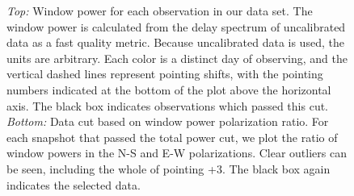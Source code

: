 \documentclass[iop]{emulateapj}
\begin{document}
\begin{figure}
\begin{center}
\caption[Window power cut]{
\emph{Top:} Window power for each observation in our data set. The window power is 
calculated from the delay spectrum of uncalibrated data as a fast quality metric. 
Because uncalibrated data is used, the units are arbitrary.
Each color 
is a distinct day of observing, and the vertical dashed lines represent pointing shifts, with 
the pointing numbers indicated at the bottom of the plot above the horizontal axis. The black 
box indicates observations which passed this cut. \emph{Bottom:} Data cut based on 
window power polarization ratio. For each snapshot that passed the total power cut, we plot 
the ratio of window powers in the N-S and E-W polarizations. Clear outliers can be seen, 
including the whole of pointing +3. The black box again indicates the selected data.
\label{fig:wedge_cut}
}
\end{center}
\end{figure}
\end{document}

